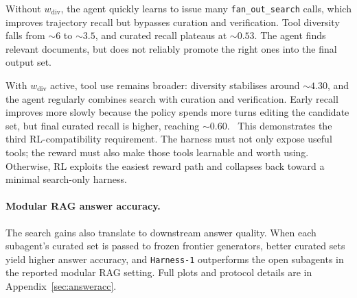 \documentclass{article}
\newcommand{\sys}{\texttt{Harness-1}\xspace}
\begin{document}
Without $w_{\mathrm{div}}$, the agent quickly learns to issue many
\texttt{fan\_out\_search} calls, which improves trajectory recall but
bypasses curation and verification. Tool diversity falls from
${\sim}6$ to ${\sim}3.5$, and curated recall plateaus at ${\sim}0.53$.
The agent finds relevant documents, but does not reliably promote the
right ones into the final output set.

With $w_{\mathrm{div}}$ active, tool use remains broader: diversity
stabilises around ${\sim}4.30$, and the agent regularly combines search
with curation and verification. Early recall improves more slowly
because the policy spends more turns editing the candidate set, but
final curated recall is higher, reaching ${\sim}0.60$.
\
This demonstrates the third RL-compatibility requirement. The harness
must not only expose useful tools; the reward must also make those
tools learnable and worth using. Otherwise, RL exploits the easiest
reward path and collapses back toward a minimal search-only harness.

\paragraph{Modular RAG answer accuracy.}
The search gains also translate to downstream answer quality. When each
subagent's curated set is passed to frozen frontier generators, better
curated sets yield higher answer accuracy, and \sys outperforms the
open subagents in the reported modular RAG setting. Full plots and
protocol details are in Appendix~\ref{sec:answeracc}.



\end{document}
